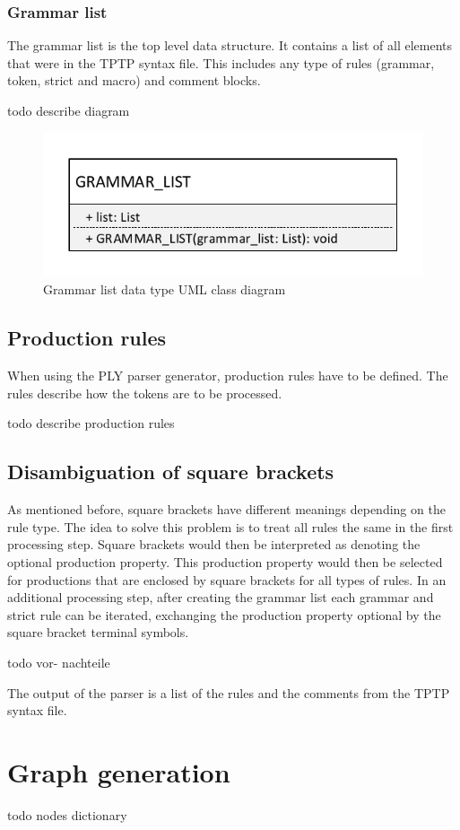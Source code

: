 \subsubsection{Grammar list}
The grammar list is the top level data structure. It contains a list of all elements that were in the \ac{TPTP} syntax file.
This includes any type of rules (grammar, token, strict and macro) and comment blocks.

todo describe diagram
\begin{figure}[H]
\centering
\includegraphics[width=.5\textwidth]{images/Concept_uml_data_types_grammar_list.pdf}
\caption{Grammar list data type UML class diagram}
\label{fig:ConceptGrammarListClassDiagram}
\end{figure}
\subsection{Production rules}
When using the \ac{PLY} parser generator, production rules have to be defined.
The rules describe how the tokens are to be processed.

todo describe production rules

\subsection{Disambiguation of  square brackets}
As mentioned before, square brackets have different meanings depending on the rule type.
The idea to solve this problem is to treat all rules the same in the first processing step.
Square brackets would then be interpreted as denoting the optional production property.
This production property would then be selected for productions that are enclosed by square brackets for all types of rules.
In an additional processing step, after creating the grammar list each grammar and strict rule can be iterated, exchanging the production property optional by the square bracket terminal symbols.

todo vor- nachteile


The output of the parser is a list of the rules and the comments from the \ac{TPTP} syntax file.
\section{Graph generation}\label{sec:ConceptGraphGeneration}
todo nodes dictionary

